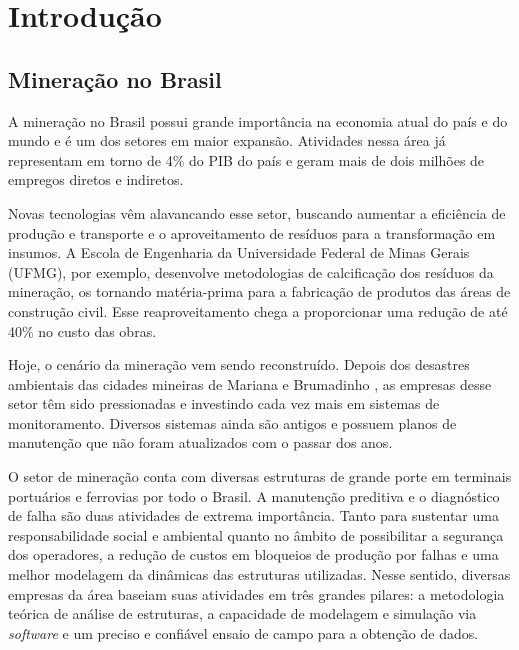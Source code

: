 \documentclass[
	12pt,				%
	openright,			%
	twoside,			%
	a4paper,			%
	english,			%
	french,				%
	spanish,			%
	brazil,				%
	]{abntex2}
\begin{document}
\tableofcontents*
\cleardoublepage

\textual


\chapter{Introdução}

	\section{Mineração no Brasil}

		A mineração no Brasil possui grande importância na economia atual do país e
		do mundo e é um dos setores em maior expansão. Atividades nessa área já
		representam em torno de 4\% do PIB do país e geram mais de dois milhões de
		empregos diretos e indiretos.\cite{pib}

		Novas tecnologias vêm alavancando esse setor, buscando aumentar a eficiência
		de produção e transporte e o aproveitamento de resíduos para a
		transformação em insumos. A Escola de Engenharia da Universidade Federal de
		Minas Gerais (UFMG), por exemplo, desenvolve metodologias de calcificação
		dos resíduos da mineração, os tornando matéria-prima para a fabricação de
		produtos das áreas de construção civil. Esse reaproveitamento chega a
		proporcionar uma redução de até 40\% no custo das obras.\cite{mineracaoUFMG}

		Hoje, o cenário da mineração vem sendo reconstruído. Depois dos desastres ambientais das cidades mineiras de Mariana \cite{mariana} e Brumadinho \cite{brumadinho} , as empresas desse setor têm sido pressionadas e investindo cada vez mais em sistemas de monitoramento. Diversos sistemas ainda são antigos e possuem planos de manutenção que não foram atualizados com o passar dos anos.
		
		O setor de mineração conta com diversas estruturas de grande porte em
		terminais portuários e ferrovias por todo o Brasil. A manutenção
		preditiva e o diagnóstico de falha são duas atividades de extrema
		importância. Tanto para sustentar uma responsabilidade social e ambiental quanto no âmbito de possibilitar a segurança dos operadores, a redução de custos em bloqueios de produção por falhas e uma melhor modelagem da dinâmicas das estruturas utilizadas. Nesse sentido,
		diversas empresas da área baseiam suas atividades em três grandes
		pilares: a metodologia teórica de análise de estruturas, a capacidade de
		modelagem e simulação via \textit{software} e um preciso e confiável
		ensaio de campo para a obtenção de dados.
		
\end{document}
